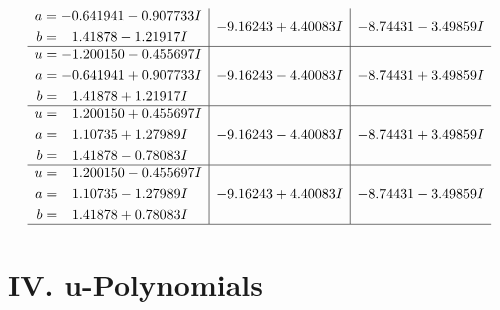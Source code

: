 \documentclass[1p]{elsarticle_modified}
\theoremstyle{definition}
\begin{document}
$$\begin{array}{c|c|c}
\begin{aligned}
a &= -0.641941 - 0.907733 I \\
b &= \phantom{-}1.41878 - 1.21917 I\end{aligned}
 & -9.16243 + 4.40083 I & -8.74431 - 3.49859 I \\ \hline\begin{aligned}
u &= -1.200150 - 0.455697 I \\
a &= -0.641941 + 0.907733 I \\
b &= \phantom{-}1.41878 + 1.21917 I\end{aligned}
 & -9.16243 - 4.40083 I & -8.74431 + 3.49859 I \\ \hline\begin{aligned}
u &= \phantom{-}1.200150 + 0.455697 I \\
a &= \phantom{-}1.10735 + 1.27989 I \\
b &= \phantom{-}1.41878 - 0.78083 I\end{aligned}
 & -9.16243 - 4.40083 I & -8.74431 + 3.49859 I \\ \hline\begin{aligned}
u &= \phantom{-}1.200150 - 0.455697 I \\
a &= \phantom{-}1.10735 - 1.27989 I \\
b &= \phantom{-}1.41878 + 0.78083 I\end{aligned}
 & -9.16243 + 4.40083 I & -8.74431 - 3.49859 I\\
 \hline 
 \end{array}$$\newpage
\newpage\renewcommand{\arraystretch}{1}
\centering \section*{ IV. u-Polynomials}
\end{document}
